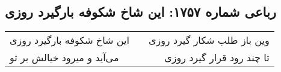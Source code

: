 \begin{center}
\section*{رباعی شماره ۱۷۵۷: این شاخ شکوفه بارگیرد روزی}
\label{sec:1757}
\begin{longtable}{l p{0.5cm} r}
این شاخ شکوفه بارگیرد روزی
&&
وین باز طلب شکار گیرد روزی
\\
می‌آید و میرود خیالش بر تو
&&
تا چند رود قرار گیرد روزی
\\
\end{longtable}
\end{center}
